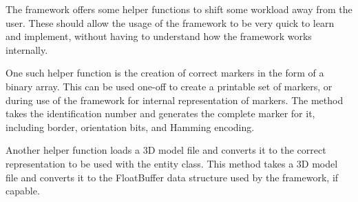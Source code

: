 The framework offers some helper functions to shift some workload away from the user.
These should allow the usage of the framework to be very quick to learn and implement, without having to understand how the framework works internally.

One such helper function is the creation of correct markers in the form of a binary array.
This can be used one-off to create a printable set of markers, or during use of the framework for internal representation of markers.
The method takes the identification number and generates the complete marker for it, including border, orientation bits, and Hamming encoding.

Another helper function loads a 3D model file and converts it to the correct representation to be used with the entity class.
This method takes a 3D model file and converts it to the FloatBuffer data structure used by the framework, if capable.
